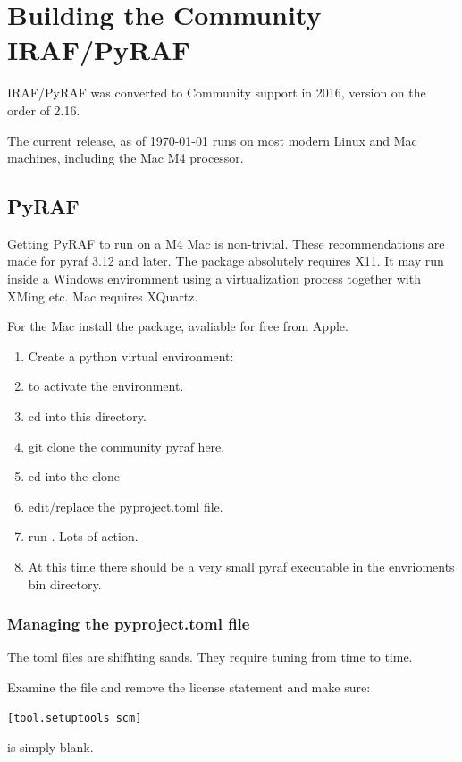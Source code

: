 \renewcommand{\footerfilename}{Community.tex}

\section{Building the Community IRAF/PyRAF}

IRAF/PyRAF was converted to Community support in 2016, version on the order of 2.16.

The current release, as of \today\; runs on most modern Linux and Mac machines, including
the Mac M4 processor.

\subsection{PyRAF}

Getting PyRAF to run on a M4 Mac is non-trivial. These recommendations are made
for pyraf 3.12 and later. The package absolutely requires X11. It may run inside
a Windows enviromment using a virtualization process together with XMing etc.
Mac requires XQuartz. 

For the Mac install the  package, avaliable for free from Apple.

\vspace{-.15cm}
\begin{enumerate}\addtolength{\itemsep}{-0.5\baselineskip}
   \item   Create a python virtual environment:
   \item   {} to activate the environment. 
   \item   cd into this directory.
   \item   git clone the community pyraf here.
   \item   cd into the clone
   \item   edit/replace the pyproject.toml file.
   \item   run . Lots of action.
   \item   At this time there should be a very small pyraf executable in the envrioments
  bin directory.
\end{enumerate}

\subsubsection{Managing the pyproject.toml file}

The toml files are shifhting sands. They require tuning from time to
time.

Examine the  file and remove the license statement
and make sure:
\begingroup \fontsize{10pt}{10pt}
\selectfont
\begin{verbatim} 
[tool.setuptools_scm]

\end{verbatim}
\endgroup
is simply blank. 
